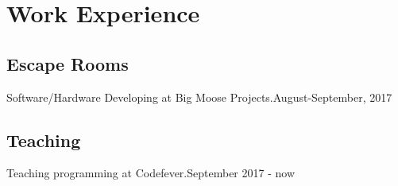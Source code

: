 \section{Work Experie\textcolor{mycolor}{nce}}
  \subsection{Escape Rooms}
    Software/Hardware Developing at {\textcolor{mycolor}{Big Moose Projects}}.{\textcolor{mygrey}{\hspace*{\fill}August-September, 2017}}
  \subsection{Teaching}
    Teaching programming at {\textcolor{mycolor}{Codefever}}.{\textcolor{mygrey}{\hspace*{\fill}September 2017 - now}}
